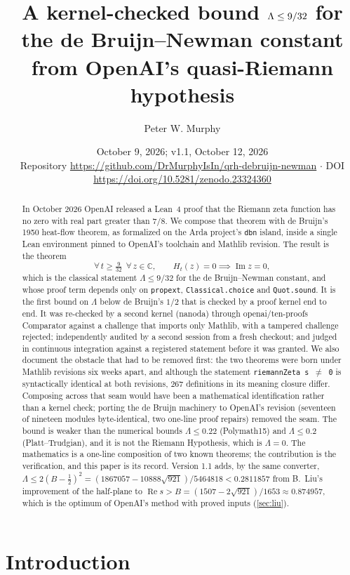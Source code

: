 \documentclass[11pt]{article}
\title{A kernel-checked bound $\Lam \le 9/32$ for the de Bruijn--Newman constant\\
from OpenAI's quasi-Riemann hypothesis}
\author{Peter W. Murphy}
\date{October 9, 2026; v1.1, October 12, 2026\\[2pt] \small Repository \url{https://github.com/DrMurphyIsIn/qrh-debruijn-newman} \;$\cdot$\; DOI \url{https://doi.org/10.5281/zenodo.23324360}}
\theoremstyle{definition}
\newcommand{\lean}[1]{\texttt{#1}}
\newcommand{\Lam}{\Lambda}
\newcommand{\Hfun}{H}
\newcommand{\re}{\operatorname{Re}}
\newcommand{\im}{\operatorname{Im}}
\newcommand{\C}{\mathbb{C}}
\begin{document}
\maketitle

\begin{abstract}
In October 2026 OpenAI released a Lean~4 proof that the Riemann zeta function has no zero with real part greater than $7/8$. We compose that theorem with de Bruijn's 1950 heat-flow theorem, as formalized on the Arda project's \lean{dbn} island, inside a single Lean environment pinned to OpenAI's toolchain and Mathlib revision. The result is the theorem
\[
\forall\, t \ge \tfrac{9}{32}\ \ \forall\, z \in \C,\qquad \Hfun_t(z) = 0 \implies \im z = 0,
\]
which is the classical statement $\Lam \le 9/32$ for the de Bruijn--Newman constant, and whose proof term depends only on \lean{propext}, \lean{Classical.choice} and \lean{Quot.sound}. It is the first bound on $\Lam$ below de Bruijn's $1/2$ that is checked by a proof kernel end to end. It was re-checked by a second kernel (nanoda) through openai/ten-proofs Comparator against a challenge that imports only Mathlib, with a tampered challenge rejected; independently audited by a second session from a fresh checkout; and judged in continuous integration against a registered statement before it was granted. We also document the obstacle that had to be removed first: the two theorems were born under Mathlib revisions six weeks apart, and although the statement \lean{riemannZeta s $\neq$ 0} is syntactically identical at both revisions, 267 definitions in its meaning closure differ. Composing across that seam would have been a mathematical identification rather than a kernel check; porting the de Bruijn machinery to OpenAI's revision (seventeen of nineteen modules byte-identical, two one-line proof repairs) removed the seam. The bound is weaker than the numerical bounds $\Lam \le 0.22$ (Polymath15) and $\Lam \le 0.2$ (Platt--Trudgian), and it is not the Riemann Hypothesis, which is $\Lam = 0$. The mathematics is a one-line composition of two known theorems; the contribution is the verification, and this paper is its record. Version 1.1 adds, by the same converter, $\Lam \le 2(B-\tfrac12)^2 = (1867057 - 10888\sqrt{921})/5464818 < 0.2811857$ from B.~Liu's improvement of the half-plane to $\re s > B = (1507 - 2\sqrt{921})/1653 \approx 0.874957$, which is the optimum of OpenAI's method with proved inputs (\cref{sec:liu}).
\end{abstract}

\section{Introduction}
\end{document}
